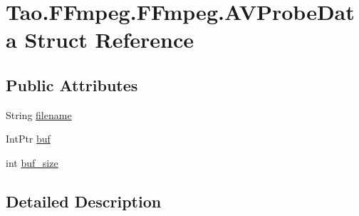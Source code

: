 \hypertarget{struct_tao_1_1_f_fmpeg_1_1_f_fmpeg_1_1_a_v_probe_data}{
\section{Tao.FFmpeg.FFmpeg.AVProbeData Struct Reference}
\label{struct_tao_1_1_f_fmpeg_1_1_f_fmpeg_1_1_a_v_probe_data}
}
\subsection*{Public Attributes}
\begin{DoxyCompactItemize}
\item 
String \hyperlink{struct_tao_1_1_f_fmpeg_1_1_f_fmpeg_1_1_a_v_probe_data_af390742215c2c76bbf9854651fe1a86c}{filename}
\item 
IntPtr \hyperlink{struct_tao_1_1_f_fmpeg_1_1_f_fmpeg_1_1_a_v_probe_data_acad61a9f491fdf295817a62589e87d69}{buf}
\item 
int \hyperlink{struct_tao_1_1_f_fmpeg_1_1_f_fmpeg_1_1_a_v_probe_data_a48cf7f345555a7cf6ba0c45d334e2cba}{buf\_\-size}
\end{DoxyCompactItemize}


\subsection{Detailed Description}



